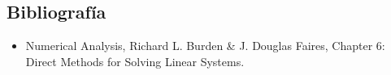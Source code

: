 \subsection{Bibliografía}

\begin{itemize}
 \item Numerical Analysis, Richard L. Burden \& J. Douglas Faires, Chapter 6: Direct Methods for Solving Linear Systems.
\end{itemize}
